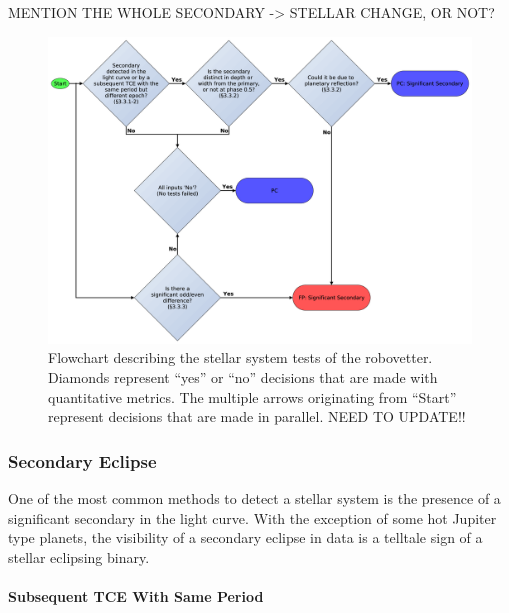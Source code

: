 

MENTION THE WHOLE SECONDARY -> STELLAR CHANGE, OR NOT?




\begin{figure}[ht]
\centering
\includegraphics[width=\linewidth]{RoboVetter-Diagram-V3-SigSec.pdf}
\caption{Flowchart describing the stellar system tests of the robovetter. Diamonds represent ``yes'' or ``no'' decisions that are made with quantitative metrics. The multiple arrows originating from ``Start'' represent decisions that are made in parallel. NEED TO UPDATE!!}
\label{robovetter-sigsec-fig}
\end{figure}


\subsubsection{Secondary Eclipse}

One of the most common methods to detect a stellar system is the presence of a significant secondary in the light curve. With the exception of some hot Jupiter type planets, the visibility of a secondary eclipse in \kepler{} data is a telltale sign of a stellar eclipsing binary.


\paragraph{Subsequent TCE With Same Period}


